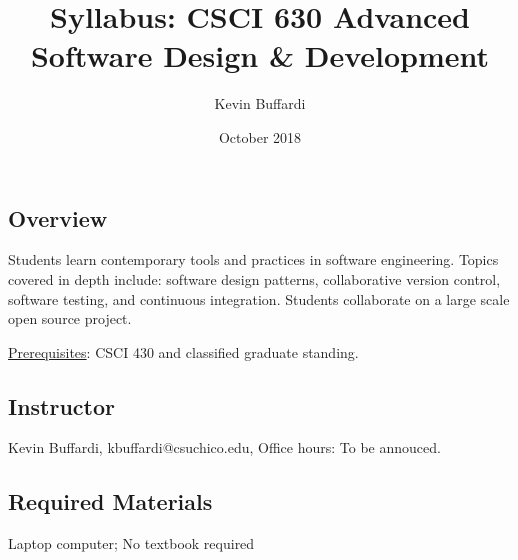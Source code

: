 \documentclass[12pt]{article}
\title{Syllabus: CSCI 630 Advanced Software Design \& Development}
\author{Kevin Buffardi}
\date{October 2018}
\begin{document}
  \maketitle
  \subsection*{Overview}	 
  \noindent
  Students learn contemporary tools and practices in software engineering. Topics covered in depth include: software design patterns, collaborative version control, software testing, and continuous integration. Students collaborate on a large scale open source project.

  \underline{Prerequisites}: CSCI 430 and classified graduate standing.
  
  \subsection*{Instructor}
  \noindent
  Kevin Buffardi, kbuffardi@csuchico.edu, Office hours: To be annouced.

  \subsection*{Required Materials}
  \noindent
  Laptop computer; No textbook required 
\end{document}
